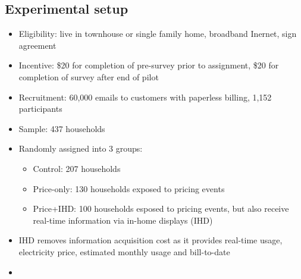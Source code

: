 \documentclass[12pt]{article}
\begin{document}
\subsection{Experimental setup}
\begin{itemize}
    \item Eligibility: live in townhouse or single family home, broadband Inernet, sign agreement
    \item Incentive: \$20 for completion of pre-survey prior to assignment, \$20 for completion of survey after end of pilot
    \item Recruitment: 60,000 emails to customers with paperless billing, 1,152 participants
    \item Sample: 437 households
    \item Randomly assigned into 3 groups:
        \begin{itemize}
            \item Control: 207 households
            \item Price-only: 130 households exposed to pricing events
            \item Price+IHD: 100 households esposed to pricing events, but also receive real-time information via in-home displays (IHD)
        \end{itemize}
    \item IHD removes information acquisition cost as it provides real-time usage, electricity price, estimated monthly usage and bill-to-date
    \item

\end{itemize}
\end{document}
